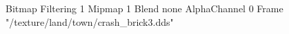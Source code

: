 {Bitmap
	{Filtering 1}
	{Mipmap 1}
	{Blend none}
	{AlphaChannel 0}
	{Frame "/texture/land/town/crash_brick3.dds"}
}
